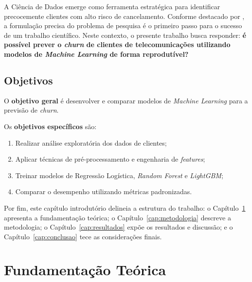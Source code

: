 \documentclass[
    12pt,
    oneside,
    a4paper,
    english,
    brazilian
    ]{abntex2}
\numberwithin{equation}{chapter}
\begin{document}
A Ciência de Dados emerge como ferramenta estratégica para identificar precocemente clientes com alto risco de cancelamento. Conforme destacado por , a formulação precisa do problema de pesquisa é o primeiro passo para o sucesso de um trabalho científico. Neste contexto, o presente trabalho busca responder: \textbf{é possível prever o \textit{churn} de clientes de telecomunicações utilizando modelos de \textit{Machine Learning} de forma reprodutível?}

\section*{Objetivos}

O \textbf{objetivo geral} é desenvolver e comparar modelos de \textit{Machine Learning} para a previsão de \textit{churn}.

Os \textbf{objetivos específicos} são:
\begin{enumerate}
    \item Realizar análise exploratória dos dados de clientes;
    \item Aplicar técnicas de pré-processamento e engenharia de \textit{features};
    \item Treinar modelos de Regressão Logística, \textit{Random Forest} e \textit{LightGBM};
    \item Comparar o desempenho utilizando métricas padronizadas.
\end{enumerate}

Por fim, este capítulo introdutório delineia a estrutura do trabalho: o Capítulo~\ref{cap:fundamentacao} apresenta a fundamentação teórica; o Capítulo~\ref{cap:metodologia} descreve a metodologia; o Capítulo~\ref{cap:resultados} expõe os resultados e discussão; e o Capítulo~\ref{cap:conclusao} tece as considerações finais.

\chapter{Fundamentação Teórica}\label{cap:fundamentacao}
\end{document}
